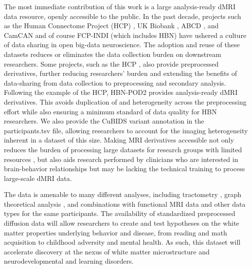 \documentclass[fleqn,10pt,inline]{wlscirep}
\begin{document}
The most immediate contribution of this work is a large analysis-ready dMRI
data resource, openly accessible to the public. In the past decade, projects such as
the Human Connectome Project (HCP) \cite{van-essen2013-oi}, UK Biobank
\cite{miller2016-mq}, ABCD \cite{jernigan2018-my}, and CamCAN
\cite{taylor2017-or,shafto2014-ld} and of course FCP-INDI (which includes HBN)
\cite{Mennes2013-dl} have ushered a culture of data sharing in open big-data
neuroscience. The adoption and reuse of these datasets reduces or eliminates the
data collection burden on downstream researchers. Some projects, such as the HCP
\cite{glasser2013-lo}, also provide preprocessed derivatives, further reducing
researchers' burden and extending the benefits of data-sharing from data
collection to preprocessing and secondary analysis. Following the example of the
HCP, HBN-POD2 provides analysis-ready dMRI derivatives. This avoids duplication
of and heterogeneity across the preprocessing effort while also ensuring a minimum standard of data quality
for HBN researchers.
We also provide the CuBIDS variant annotation in the participants.tsv file, allowing researchers to account for the imaging heterogeneity inherent in a dataset of this size.
Making MRI derivatives accessible not only reduces the burden of processing large datasets for research groups with limited resources \cite{laird2021large}, but also aids research performed by clinicians who are interested in brain-behavior relationships but may be lacking the technical training to process large-scale dMRI data.

The data is amenable to many different analyses, including
tractometry \cite{yeatman2012-rc, yeatman2018browser, kruper2021evaluating}, graph theoretical analysis \cite{yeh2020-nu},
and combinations with functional MRI data and other data types for the same
participants. The availability of standardized preprocessed diffusion data will
allow researchers to create and test hypotheses on the white matter properties
underlying behavior and disease, from reading and math acquisition to childhood
adversity and mental health. As such, this dataset will accelerate discovery at
the nexus of white matter microstructure and neurodevelopmental and learning
disorders.
\end{document}
